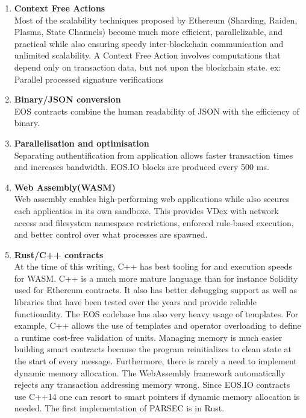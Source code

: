 \documentclass[]{article}
\begin{document}
	\begin{enumerate}
					
			\item \textbf{Context Free Actions} \\
		Most of the scalability techniques proposed by Ethereum (Sharding, Raiden, Plasma, State Channels) 
		become much more efficient, parallelizable, and practical while also ensuring speedy inter-blockchain communication and unlimited scalability.
		A Context Free Action involves computations that depend only on transaction data, but not upon the blockchain state.
		ex: Parallel processed signature verifications\\
		
		\item\textbf{ Binary/JSON conversion} \\
		 EOS contracts combine the human readability of JSON with the efficiency of binary. \\
	
		\item \textbf{Parallelisation and optimisation\\ } 
		Separating authentification from application allows faster transaction times and increases bandwidth.
		EOS.IO blocks are produced every 500 ms.
		
	\item \textbf{Web Assembly(WASM)}   \\
	Web assembly enables high-performing web applications while also secures each applicatios in its own sandboxe.
	This provides VDex with network access and filesystem namespace restrictions, enforced rule-based execution, and better control over what processes are spawned.
	
	\item \textbf{Rust/C++ contracts\\}
	At the time of this writing,
	C++ has best tooling for and execution speeds for WASM.
	C++ is a much more mature language than for instance Solidity used for Ethereum contracts.
	It also has better debugging support as well as libraries that have been tested over the years and provide reliable functionality. 
	The EOS codebase has also very heavy usage of templates.
	For example, C++ allows the use of templates and operator overloading to define a runtime cost-free validation of units.
	Managing memory is much easier building smart contracts because the
	program reinitializes to clean state at the start of every message. Furthermore, there is rarely a need to implement dynamic memory allocation. 
	The WebAssembly framework automatically rejects any transaction addressing memory wrong.
	Since EOS.IO contracts use C++14 one can resort to smart pointers if dynamic memory allocation is needed.
	The first implementation of PARSEC is in Rust.\cite{23}
	 	

\end{enumerate}
\end{document}
